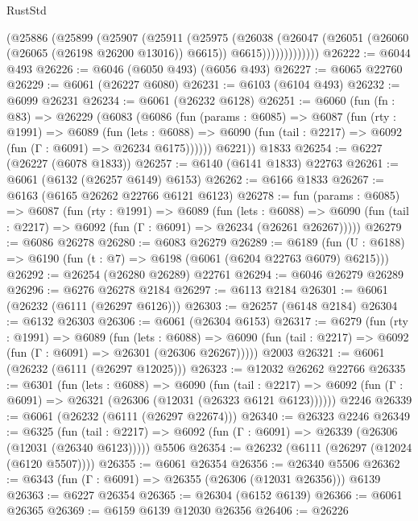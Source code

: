 \begin{lexlean}{RustStd}
\begin{coremodule}
                (@25886
                  (@25899
                    (@25907
                      (@25911
                        (@25975
                          (@26038
                            (@26047
                              (@26051 (@26060 (@26065 (@26198 @26200 @13016)) @6615))
                              @6615)))))))))))))
@26222 := @6044 @493
@26226 := @6046 (@6050 @493) (@6056 @493)
@26227 := @6065 @22760
@26229 := @6061 (@26227 @6080)
@26231 := @6103 (@6104 @493)
@26232 := @6099 @26231
@26234 := @6061 (@26232 @6128)
@26251 := @6060
    (fun (fn : @83) =>
    @26229
      (@6083
        (@6086
          (fun (params : @6085) =>
          @6087
            (fun (rty : @1991) =>
            @6089
              (fun (lets : @6088) =>
              @6090 (fun (tail : @2217) => @6092 (fun (Γ : @6091) => @26234 @6175))))))
        @6221))
    @1833
@26254 := @6227 (@26227 (@6078 @1833))
@26257 := @6140 (@6141 @1833) @22763
@26261 := @6061 (@6132 (@26257 @6149) @6153)
@26262 := @6166 @1833
@26267 := @6163 (@6165 @26262 @22766 @6121 @6123)
@26278 := fun (params : @6085) =>
  @6087
    (fun (rty : @1991) =>
    @6089
      (fun (lets : @6088) =>
      @6090 (fun (tail : @2217) => @6092 (fun (Γ : @6091) => @26234 (@26261 @26267)))))
@26279 := @6086 @26278
@26280 := @6083 @26279
@26289 := @6189
    (fun (U : @6188) => @6190 (fun (t : @7) => @6198 (@6061 (@6204 @22763 @6079) @6215)))
@26292 := @26254 (@26280 @26289) @22761
@26294 := @6046 @26279 @26289
@26296 := @6276 @26278 @2184
@26297 := @6113 @2184
@26301 := @6061 (@26232 (@6111 (@26297 @6126)))
@26303 := @26257 (@6148 @2184)
@26304 := @6132 @26303
@26306 := @6061 (@26304 @6153)
@26317 := @6279
    (fun (rty : @1991) =>
    @6089
      (fun (lets : @6088) =>
      @6090 (fun (tail : @2217) => @6092 (fun (Γ : @6091) => @26301 (@26306 @26267)))))
    @2003
@26321 := @6061 (@26232 (@6111 (@26297 @12025)))
@26323 := @12032 @26262 @22766
@26335 := @6301
    (fun (lets : @6088) =>
    @6090
      (fun (tail : @2217) =>
      @6092 (fun (Γ : @6091) => @26321 (@26306 (@12031 (@26323 @6121 @6123))))))
    @2246
@26339 := @6061 (@26232 (@6111 (@26297 @22674)))
@26340 := @26323 @2246
@26349 := @6325
    (fun (tail : @2217) => @6092 (fun (Γ : @6091) => @26339 (@26306 (@12031 (@26340 @6123)))))
    @5506
@26354 := @26232 (@6111 (@26297 (@12024 (@6120 @5507))))
@26355 := @6061 @26354
@26356 := @26340 @5506
@26362 := @6343 (fun (Γ : @6091) => @26355 (@26306 (@12031 @26356))) @6139
@26363 := @6227 @26354
@26365 := @26304 (@6152 @6139)
@26366 := @6061 @26365
@26369 := @6159 @6139 @12030 @26356
@26406 := @26226

\end{coremodule}
\end{lexlean}
